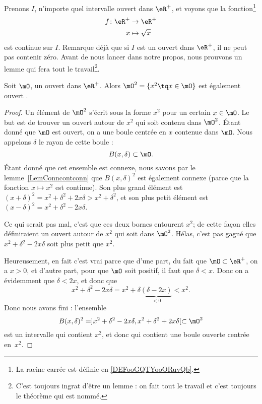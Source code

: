 Prenons $I$, n'importe quel intervalle ouvert dans $\eR^+$, et voyons que la fonction\footnote{La racine carrée est définie en \ref{DEFooGQTYooORuvQb}.}
\begin{equation}
	\begin{aligned}
		f\colon \eR^+ & \to \eR^+        \\
		x             & \mapsto \sqrt{x}
	\end{aligned}
\end{equation}
est continue sur $I$. Remarque déjà que si $I$ est un ouvert dans $\eR^+$, il ne peut pas contenir zéro. Avant de nous lancer dans notre propos, nous prouvons un lemme qui fera tout le travail\footnote{C'est toujours ingrat d'être un lemme : on fait tout le travail et c'est toujours le théorème qui est nommé.}.

\begin{lemma}
	Soit $\mO$, un ouvert dans $\eR^+$. Alors $\mO^2=\{ x^2\tq x\in\mO \}$ est également ouvert .
\end{lemma}

\begin{proof}
	Un élément de $\mO^2$ s'écrit sous la forme $x^2$ pour un certain $x\in\mO$. Le but est de trouver un ouvert autour de $x^2$ qui soit contenu dans $\mO^2$. Étant donné que $\mO$ est ouvert, on a une boule centrée en $x$ contenue dans $\mO$. Nous appelons $\delta$ le rayon de cette boule :
	\[
		B(x,\delta)\subset\mO.
	\]
	Étant donné que cet ensemble est connexe, nous savons par le lemme~\ref{LemConncontconn} que $B(x,\delta)^2$ est également connexe (parce que la fonction $x\mapsto x^2$ est continue). Son plus grand élément est $(x+\delta)^2=x^2+\delta^2+2x\delta>x^2+\delta^2$, et son plus petit élément est $(x-\delta)^2=x^2+\delta^2-2x\delta$.

	Ce qui serait pas mal, c'est que ces deux bornes entourent $x^2$; de cette façon elles définiraient un ouvert autour de $x^2$ qui soit dans $\mO^2$. Hélas, c'est pas gagné que $x^2+\delta^2-2x\delta$ soit plus petit que $x^2$.

	Heureusement, en fait c'est vrai parce que d'une part, du fait que $\mO\subset\eR^+$, on a $x>0$, et d'autre part, pour que $\mO$ soit positif, il faut que $\delta<x$. Donc on a évidemment que $\delta<2x$, et donc que
	\[
		x^2+\delta^2-2x\delta=x^2+\delta\underbrace{(\delta-2x)}_{<0}<x^2.
	\]
	Donc nous avons fini : l'ensemble
	\[
		B(x,\delta)^2=]x^2+\delta^2-2x\delta,x^2+\delta^2+2x\delta[\subset\mO^2
	\]
	est un intervalle qui contient $x^2$, et donc qui contient une boule ouverte centrée en~$x^2$.
\end{proof}

